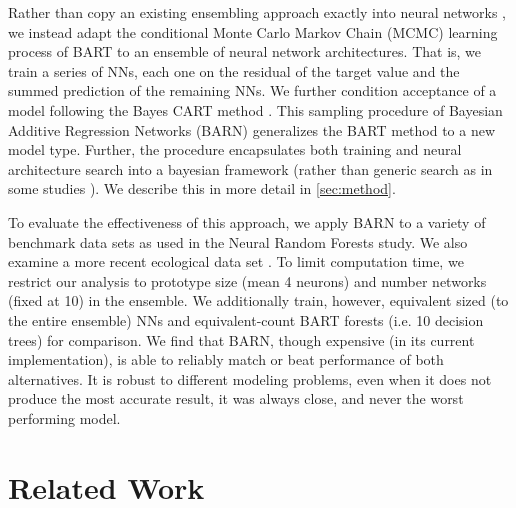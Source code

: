 \documentclass[12pt]{article}
\begin{document}
Rather than copy an existing ensembling approach exactly into neural networks \cite[for example]{biau2019neural}, we instead adapt the conditional Monte Carlo Markov Chain (MCMC) learning process of BART \cite{chipman2010bart} to an ensemble of neural network architectures.  That is, we train a series of NNs, each one on the residual of the target value and the summed prediction of the remaining NNs.  We further condition acceptance of a model following the Bayes CART method \cite{chipman1998bayesian}.  This sampling procedure of Bayesian Additive Regression Networks (BARN) generalizes the BART method to a new model type.  Further, the procedure encapsulates both training and neural architecture search into a bayesian framework (rather than generic search as in some studies \cite{idrissi2016genetic}).  We describe this in more detail in \autoref{sec:method}.

To evaluate the effectiveness of this approach, we apply BARN to a variety of benchmark data sets \cite{Dua:2019} as used in the Neural Random Forests \cite{biau2019neural} study.  We also examine a more recent ecological data set \cite{roman2022bayclump}.  To limit computation time, we restrict our analysis to prototype size (mean 4 neurons) and number networks (fixed at 10) in the ensemble.  We additionally train, however, equivalent sized (to the entire ensemble) NNs and equivalent-count BART forests (i.e. 10 decision trees) for comparison.  We find that BARN, though expensive (in its current implementation), is able to reliably match or beat performance of both alternatives.  It is robust to different modeling problems, even when it does not produce the most accurate result, it was always close, and never the worst performing model.

\section{Related Work}\label{sec:related}
\end{document}
